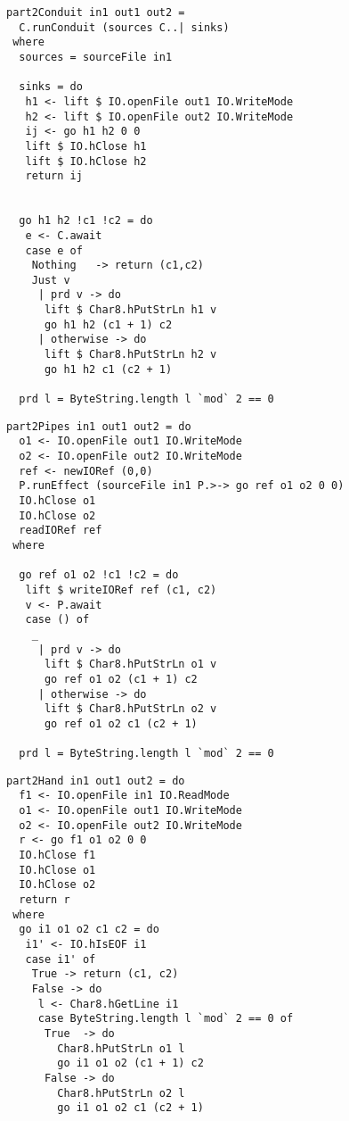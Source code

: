 \begin{lstlisting}[float,label=l:a:bench:part2Conduit,caption=Conduit implementation of \Hs/part2/]
part2Conduit in1 out1 out2 =
  C.runConduit (sources C..| sinks)
 where
  sources = sourceFile in1

  sinks = do
   h1 <- lift $ IO.openFile out1 IO.WriteMode
   h2 <- lift $ IO.openFile out2 IO.WriteMode
   ij <- go h1 h2 0 0
   lift $ IO.hClose h1
   lift $ IO.hClose h2
   return ij


  go h1 h2 !c1 !c2 = do
   e <- C.await
   case e of
    Nothing   -> return (c1,c2)
    Just v
     | prd v -> do
      lift $ Char8.hPutStrLn h1 v
      go h1 h2 (c1 + 1) c2
     | otherwise -> do
      lift $ Char8.hPutStrLn h2 v
      go h1 h2 c1 (c2 + 1)

  prd l = ByteString.length l `mod` 2 == 0
\end{lstlisting}

\begin{lstlisting}[float,label=l:a:bench:part2Pipes,caption=Pipes implementation of \Hs/part2/]
part2Pipes in1 out1 out2 = do
  o1 <- IO.openFile out1 IO.WriteMode
  o2 <- IO.openFile out2 IO.WriteMode
  ref <- newIORef (0,0)
  P.runEffect (sourceFile in1 P.>-> go ref o1 o2 0 0)
  IO.hClose o1
  IO.hClose o2
  readIORef ref
 where

  go ref o1 o2 !c1 !c2 = do
   lift $ writeIORef ref (c1, c2)
   v <- P.await
   case () of
    _
     | prd v -> do
      lift $ Char8.hPutStrLn o1 v
      go ref o1 o2 (c1 + 1) c2
     | otherwise -> do
      lift $ Char8.hPutStrLn o2 v
      go ref o1 o2 c1 (c2 + 1)

  prd l = ByteString.length l `mod` 2 == 0
\end{lstlisting}

\begin{lstlisting}[float,label=l:a:bench:part2Hand,caption=Hand implementation of \Hs/part2/]
part2Hand in1 out1 out2 = do
  f1 <- IO.openFile in1 IO.ReadMode
  o1 <- IO.openFile out1 IO.WriteMode
  o2 <- IO.openFile out2 IO.WriteMode
  r <- go f1 o1 o2 0 0
  IO.hClose f1
  IO.hClose o1
  IO.hClose o2
  return r
 where
  go i1 o1 o2 c1 c2 = do
   i1' <- IO.hIsEOF i1
   case i1' of
    True -> return (c1, c2)
    False -> do
     l <- Char8.hGetLine i1
     case ByteString.length l `mod` 2 == 0 of
      True  -> do
        Char8.hPutStrLn o1 l
        go i1 o1 o2 (c1 + 1) c2
      False -> do
        Char8.hPutStrLn o2 l
        go i1 o1 o2 c1 (c2 + 1)
\end{lstlisting}

